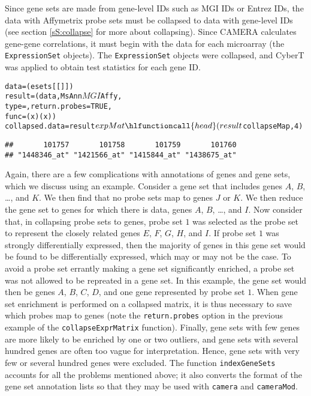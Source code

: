 Since gene sets are made from gene-level IDs such as MGI IDs or 
Entrez IDs, the data with Affymetrix probe sets must be collapsed
to data with gene-level IDs (see section \ref{sS:collapse} for more about collapsing).
Since CAMERA calculates gene-gene correlations, it must begin with
the data for each microarray (the \texttt{ExpressionSet} objects). The
\texttt{ExpressionSet} objects were collapsed, and CyberT was applied to obtain
test statistics for each gene ID.

\begin{knitrout}
\color{fgcolor}\begin{kframe}
\begin{alltt}
data = (esets[[]])
result = (data, MsAnn$MGI$Affy, 
    type = , return.probes = TRUE,
    func = (x) (x) )
collapsed.data = result$expMat
\hlfunctioncall{head}(result$collapseMap, 4)
\end{alltt}
\begin{verbatim}
##       101757       101758       101759       101760
## "1448346_at" "1421566_at" "1415844_at" "1438675_at"
\end{verbatim}
\end{kframe}
\end{knitrout}

Again, there are a few complications with annotations of genes and gene sets, which
we discuss using an example. Consider a gene set that includes genes $A$, $B$, \ldots , and $K$.
We then find that no probe sets map to genes $J$ or $K$. We then reduce the gene set to genes
for which there is data, genes $A$, $B$, \ldots , and $I$. Now consider that,
in collapsing probe sets to genes,  probe set $1$ was selected as the probe set
to represent the closely related genes $E$, $F$, $G$, $H$, and $I$. If probe set $1$
was strongly differentially expressed, then the majority of genes in this
gene set would be found to be differentially expressed, which may or may not
be the case. To avoid a probe set errantly making a gene set
significantly enriched, a probe set was not allowed to be repreated in a  gene set. 
In this example, the gene
set would then be genes $A$, $B$, $C$, $D$, and one gene represented by probe set $1$.
When gene set enrichment is performed on a collapsed matrix, it is thus necessary
to save which probes map to genes (note the \texttt{return.probes} option in the
previous example of the \texttt{collapseExprMatrix} function). Finally, gene sets with
few genes are more likely to be enriched by one or two outliers, and
gene sets with several hundred genes are often too vague for interpretation. Hence,
gene sets with very few or several hundred genes were excluded. The function
\texttt{indexGeneSets} accounts for all the problems mentioned above; it also
converts the format of the gene set annotation lists so that they may be
used with \texttt{camera} and \texttt{cameraMod}.

